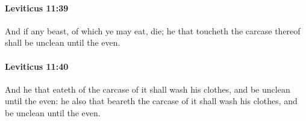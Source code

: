 		\paragraph{Leviticus 11:39} %
			\label{LEVITICUS-11-39}

			And if any beast, of which ye may eat, die; he that toucheth the carcase thereof shall be unclean until the even.


		\paragraph{Leviticus 11:40} %
			\label{LEVITICUS-11-40}

			And he that eateth of the carcase of it shall wash his clothes, and be unclean until the even: he also that beareth the carcase of it shall wash his clothes, and be unclean until the even.


